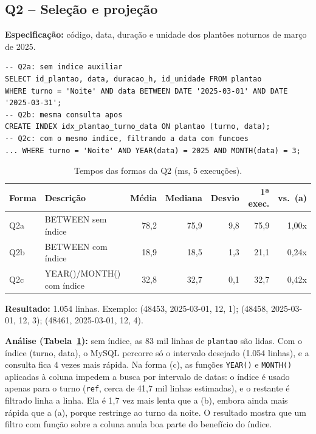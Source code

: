 \documentclass[10pt,a4paper]{article}
\begin{document}
\subsection{Q2 -- Seleção e projeção}
\textbf{Especificação:} código, data, duração e unidade dos plantões noturnos de março de 2025.

\begin{lstlisting}
-- Q2a: sem indice auxiliar
SELECT id_plantao, data, duracao_h, id_unidade FROM plantao
WHERE turno = 'Noite' AND data BETWEEN DATE '2025-03-01' AND DATE '2025-03-31';
-- Q2b: mesma consulta apos
CREATE INDEX idx_plantao_turno_data ON plantao (turno, data);
-- Q2c: com o mesmo indice, filtrando a data com funcoes
... WHERE turno = 'Noite' AND YEAR(data) = 2025 AND MONTH(data) = 3;
\end{lstlisting}

\begin{table}[H]\centering\footnotesize
\caption{Tempos das formas da Q2 (ms, 5 execuções).}\label{tab:q2}
\begin{tabular}{llrrrrr}\toprule
Forma & Descrição & Média & Mediana & Desvio & 1ª exec. & vs.\ (a) \\ \midrule
Q2a & BETWEEN sem índice         & 78,2 & 75,9 & 9,8 & 75,9 & 1,00x \\
Q2b & BETWEEN com índice         & 18,9 & 18,5 & 1,3 & 21,1 & 0,24x \\
Q2c & YEAR()/MONTH() com índice  & 32,8 & 32,7 & 0,1 & 32,7 & 0,42x \\ \bottomrule
\end{tabular}
\end{table}

\textbf{Resultado:} 1.054 linhas. Exemplo: (48453, 2025-03-01, 12, 1); (48458, 2025-03-01, 12, 3); (48461, 2025-03-01, 12, 4).

\textbf{Análise (Tabela~\ref{tab:q2}):} sem índice, as 83 mil linhas de \texttt{plantao} são lidas. Com o índice (turno, data), o MySQL percorre só o intervalo desejado (1.054 linhas), e a consulta fica 4 vezes mais rápida. Na forma (c), as funções \texttt{YEAR()} e \texttt{MONTH()} aplicadas à coluna impedem a busca por intervalo de datas: o índice é usado apenas para o turno (\texttt{ref}, cerca de 41,7 mil linhas estimadas), e o restante é filtrado linha a linha. Ela é 1,7 vez mais lenta que a (b), embora ainda mais rápida que a (a), porque restringe ao turno da noite. O resultado mostra que um filtro com função sobre a coluna anula boa parte do benefício do índice.
\end{document}
